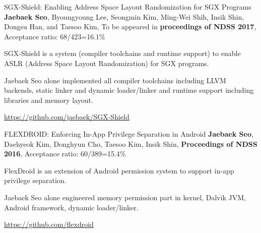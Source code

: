 

\begin{cventries}

  \paperentry
    {SGX-Shield: Enabling Address Space Layout Randomization for SGX Programs} %
    {\textbf{Jaebaek Seo}, Byoungyoung Lee, Seongmin Kim, Ming-Wei Shih, Insik Shin, Dongsu Han, and Taesoo Kim, } %
    { To be appeared in \textbf{proceedings of NDSS 2017}, Acceptance ratio: 68/423=16.1\% } %
    {
        \begin{cvitems} %
        \item {SGX-Shield is a system (compiler toolchains and runtime support)
            to enable ASLR (Address Space Layout Randomization) for SGX programs.}
        \item {Jaebaek Seo alone implemented all compiler toolchains including
                LLVM backends, static linker and dynamic loader/linker and runtime
            support including libraries and memory layout.}
        \item {\url{https://github.com/jaebaek/SGX-Shield}}
        \end{cvitems}
    }

  \paperentry
    { FLEXDROID: Enforcing In-App Privilege Separation in Android } %
    { \textbf{Jaebaek Seo}, Daehyeok Kim, Donghyun Cho, Taesoo Kim, Insik Shin, }
    { \textbf{Proceedings of NDSS 2016}, Acceptance ratio: 60/389=15.4\% } %
    {
        \begin{cvitems} %
        \item {FlexDroid is an extension of Android permission system
            to support in-app privilege separation.}
        \item {Jaebaek Seo alone engineered memory permission part in kernel,
            Dalvik JVM, Android framework, dynamic loader/linker.}
        \item {\url{https://github.com/flexdroid}}
        \end{cvitems}
    }


\end{cventries}
